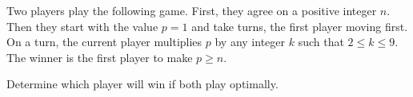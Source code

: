Two players play the following game. First, they agree on a positive integer $n$. Then they start with the value $p = 1$ and take turns, the first player moving first. On a turn, the current player multiplies $p$ by any integer $k$ such that $2 \le k \le 9$. The winner is the first player to make $p \ge n$.

Determine which player will win if both play optimally.
